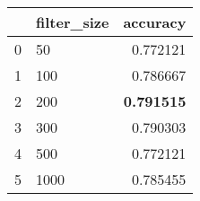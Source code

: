 \begin{tabular}{llr}
\toprule
{} & filter\_size &  accuracy \\
\midrule
0 &          50 &  0.772121 \\
1 &         100 &  0.786667 \\
2 &         200 &  \textbf{0.791515} \\
3 &         300 &  0.790303 \\
4 &         500 &  0.772121 \\
5 &        1000 &  0.785455 \\
\bottomrule
\end{tabular}
